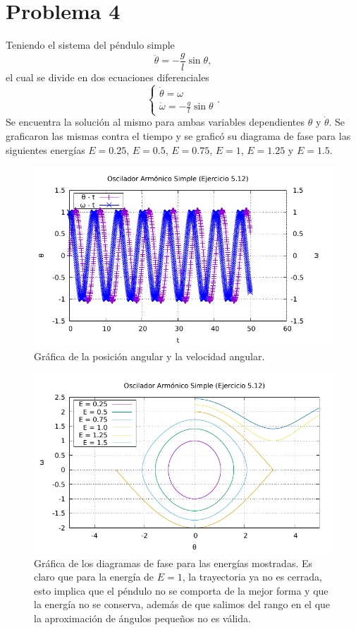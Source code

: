 \section*{Problema 4}
Teniendo el sistema del péndulo simple
	$$ \ddot{\theta} = -\frac{g}{l} \sin{\theta}, $$
el cual se divide en dos ecuaciones diferenciales
	$$ \left\{\begin{array}{c}
		\dot{\theta} = \omega \\
		\dot{\omega} = -\frac{g}{l} \sin{\theta}
	\end{array}\right. .$$
Se encuentra la solución al mismo para ambas variables dependientes $\theta$ y $\dot{\theta}$. Se graficaron las mismas contra el tiempo y se graficó su diagrama de fase para las siguientes energías $E = 0.25$, $E =  0.5$, $E = 0.75$, $E = 1$, $E = 1.25$ y $E = 1.5$.

\begin{figure}[H]
	\centering
	\includegraphics[scale=1]{../img/ej5-12-1.pdf}
	\caption{Gráfica de la posición angular y la velocidad angular.}
	\label{ej5-12-1}
\end{figure}

\begin{figure}[H]
	\centering
	\includegraphics[scale=1]{../img/ej5-12-3.pdf}
	\caption{Gráfica de los diagramas de fase para las energías mostradas. Es claro que para la energía de $E = 1$, la trayectoria ya no es cerrada, esto implica que el péndulo no se comporta de la mejor forma y que la energía no se conserva, además de que salimos del rango en el que la aproximación de ángulos pequeños no es válida.}
	\label{ej5-12-1}
\end{figure}

